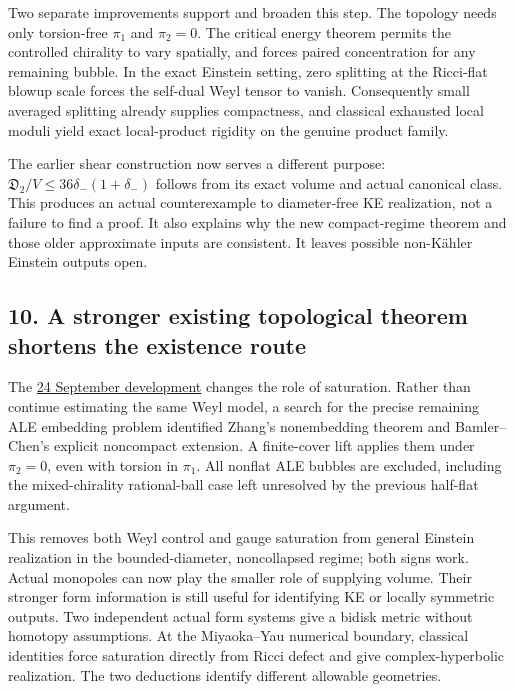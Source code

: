 \documentclass[
  10pt,
]{article}
\begin{document}
Two separate improvements support and broaden this step. The topology
needs only torsion-free \(\pi_1\) and \(\pi_2=0\). The critical energy
theorem permits the controlled chirality to vary spatially, and forces
paired concentration for any remaining bubble. In the exact Einstein
setting, zero splitting at the Ricci-flat blowup scale forces the
self-dual Weyl tensor to vanish. Consequently small averaged splitting
already supplies compactness, and classical exhausted local moduli yield
exact local-product rigidity on the genuine product family.

The earlier shear construction now serves a different purpose:
\(\mathfrak D_2/V\le36\delta_-(1+\delta_-)\) follows from its exact
volume and actual canonical class. This produces an actual
counterexample to diameter-free KE realization, not a failure to find a
proof. It also explains why the new compact-regime theorem and those
older approximate inputs are consistent. It leaves possible non-Kähler
Einstein outputs open.

\hypertarget{a-stronger-existing-topological-theorem-shortens-the-existence-route}{%
\subsection{10. A stronger existing topological theorem shortens the
existence
route}\label{a-stronger-existing-topological-theorem-shortens-the-existence-route}}

The \href{../continuation/20260924_global_realization.md}{24 September
development} changes the role of saturation. Rather than continue
estimating the same Weyl model, a search for the precise remaining ALE
embedding problem identified Zhang's nonembedding theorem and
Bamler--Chen's explicit noncompact extension. A finite-cover lift
applies them under \(\pi_2=0\), even with torsion in \(\pi_1\). All
nonflat ALE bubbles are excluded, including the mixed-chirality
rational-ball case left unresolved by the previous half-flat argument.

This removes both Weyl control and gauge saturation from general
Einstein realization in the bounded-diameter, noncollapsed regime; both
signs work. Actual monopoles can now play the smaller role of supplying
volume. Their stronger form information is still useful for identifying
KE or locally symmetric outputs. Two independent actual form systems
give a bidisk metric without homotopy assumptions. At the Miyaoka--Yau
numerical boundary, classical identities force saturation directly from
Ricci defect and give complex-hyperbolic realization. The two deductions
identify different allowable geometries.
\end{document}
